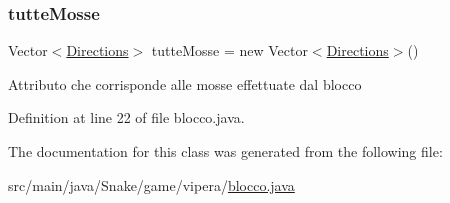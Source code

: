 \subsubsection{\texorpdfstring{tutte\+Mosse}{tutteMosse}}
{\footnotesize\ttfamily Vector$<$\mbox{\hyperlink{enum_snake_1_1game_1_1utility_1_1_directions}{Directions}}$>$ tutte\+Mosse = new Vector$<$\mbox{\hyperlink{enum_snake_1_1game_1_1utility_1_1_directions}{Directions}}$>$()\hspace{0.3cm}{\ttfamily [private]}}

Attributo che corrisponde alle mosse effettuate dal blocco 

Definition at line 22 of file blocco.\+java.



The documentation for this class was generated from the following file\+:\begin{DoxyCompactItemize}
\item 
src/main/java/\+Snake/game/vipera/\mbox{\hyperlink{blocco_8java}{blocco.\+java}}\end{DoxyCompactItemize}
